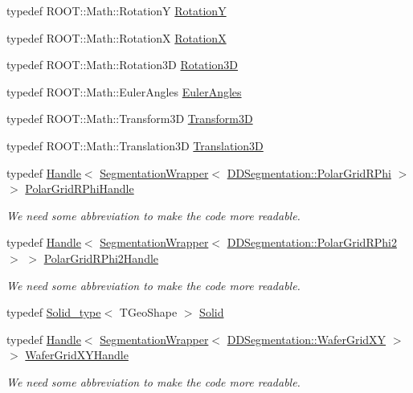 \begin{DoxyCompactItemize}
\item 
typedef ROOT::Math::RotationY \hyperlink{namespace_d_d4hep_1_1_geometry_a452190ab96c581a3e59793c7ae11e3f1}{RotationY}
\item 
typedef ROOT::Math::RotationX \hyperlink{namespace_d_d4hep_1_1_geometry_a42f6ad69a030aba78a706e72c7ef220e}{RotationX}
\item 
typedef ROOT::Math::Rotation3D \hyperlink{namespace_d_d4hep_1_1_geometry_a022fecb763315fa2bf39cbb648944a0e}{Rotation3D}
\item 
typedef ROOT::Math::EulerAngles \hyperlink{namespace_d_d4hep_1_1_geometry_a48c636127488441c543a2c7237cba0d1}{EulerAngles}
\item 
typedef ROOT::Math::Transform3D \hyperlink{namespace_d_d4hep_1_1_geometry_aeb4c0356d12fd7be49a0aae50514e64b}{Transform3D}
\item 
typedef ROOT::Math::Translation3D \hyperlink{namespace_d_d4hep_1_1_geometry_ab90afde486c9b46f4fa91bc659271b99}{Translation3D}
\item 
typedef \hyperlink{class_d_d4hep_1_1_handle}{Handle}$<$ \hyperlink{class_d_d4hep_1_1_geometry_1_1_segmentation_wrapper}{SegmentationWrapper}$<$ \hyperlink{class_d_d4hep_1_1_d_d_segmentation_1_1_polar_grid_r_phi}{DDSegmentation::PolarGridRPhi} $>$ $>$ \hyperlink{namespace_d_d4hep_1_1_geometry_a3b5a44856fd99ab92095fea0764485d3}{PolarGridRPhiHandle}
\begin{DoxyCompactList}\small\item\em We need some abbreviation to make the code more readable. \item\end{DoxyCompactList}\item 
typedef \hyperlink{class_d_d4hep_1_1_handle}{Handle}$<$ \hyperlink{class_d_d4hep_1_1_geometry_1_1_segmentation_wrapper}{SegmentationWrapper}$<$ \hyperlink{class_d_d4hep_1_1_d_d_segmentation_1_1_polar_grid_r_phi2}{DDSegmentation::PolarGridRPhi2} $>$ $>$ \hyperlink{namespace_d_d4hep_1_1_geometry_a0cd92d5c1d6efd314dfa1a555faab017}{PolarGridRPhi2Handle}
\begin{DoxyCompactList}\small\item\em We need some abbreviation to make the code more readable. \item\end{DoxyCompactList}\item 
typedef \hyperlink{class_d_d4hep_1_1_geometry_1_1_solid__type}{Solid\_\-type}$<$ TGeoShape $>$ \hyperlink{namespace_d_d4hep_1_1_geometry_a83de90a8dcc7378ba47d54ef9a6a687b}{Solid}
\item 
typedef \hyperlink{class_d_d4hep_1_1_handle}{Handle}$<$ \hyperlink{class_d_d4hep_1_1_geometry_1_1_segmentation_wrapper}{SegmentationWrapper}$<$ \hyperlink{class_d_d4hep_1_1_d_d_segmentation_1_1_wafer_grid_x_y}{DDSegmentation::WaferGridXY} $>$ $>$ \hyperlink{namespace_d_d4hep_1_1_geometry_a867af80aa83c181772e515bb22a1de35}{WaferGridXYHandle}
\begin{DoxyCompactList}\small\item\em We need some abbreviation to make the code more readable. \item\end{DoxyCompactList}\end{DoxyCompactItemize}
